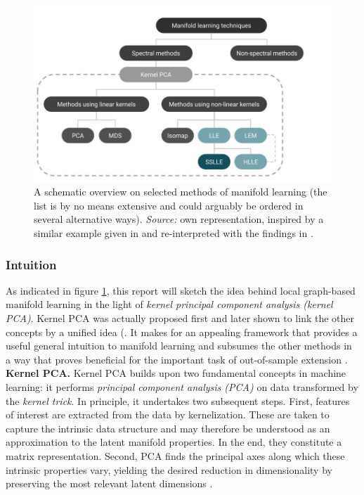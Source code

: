 \begin{figure}[H]
    \centering
    \includegraphics[trim = 0 0 0 0, clip, %
      width = \textwidth]{figures/models-overview}
    \caption[Overview on selected manifold learning models]{A schematic overview 
    on selected methods of manifold learning (the list is by no means extensive 
    and could arguably be ordered in several alternative ways). 
    \textit{Source:} own representation, inspired by a similar example given in 
    \citet{vandermaatenetal2009} and re-interpreted with the findings in 
    \citet{bengioetal2004}.}
    \label{fig-models-overview}
  \end{figure}


\subsubsection{Intuition}
\label{intuition}

As indicated in figure \ref{fig-models-overview}, this report will 
sketch the idea behind local graph-based manifold learning in the light of 
\textit{kernel principal component analysis (kernel PCA)}.
Kernel PCA was actually proposed first and later shown to link the other 
concepts by a unified idea (\citet{hametal2003}.
It makes for an appealing framework that provides a useful general 
intuition to manifold learning and subsumes the other methods in a 
way that proves beneficial for the important task of out-of-sample extension \citep{bengioetal2004}.
\\

\textbf{Kernel PCA.} Kernel PCA builds upon two fundamental concepts 
in machine learning: it performs \textit{principal component analysis (PCA)} on 
data transformed by the \textit{kernel trick}.
In principle, it undertakes two subsequent steps.
First, features of interest are extracted from the data by kernelization. 
These are taken to capture the intrinsic data structure and may therefore be 
understood as an approximation to the latent manifold properties.
In the end, they constitute a matrix representation.
Second, PCA finds the principal axes along which these intrinsic properties 
vary, yielding the desired reduction in dimensionality by preserving the most 
relevant latent dimensions \citep{schoelkopfetal1998}.

